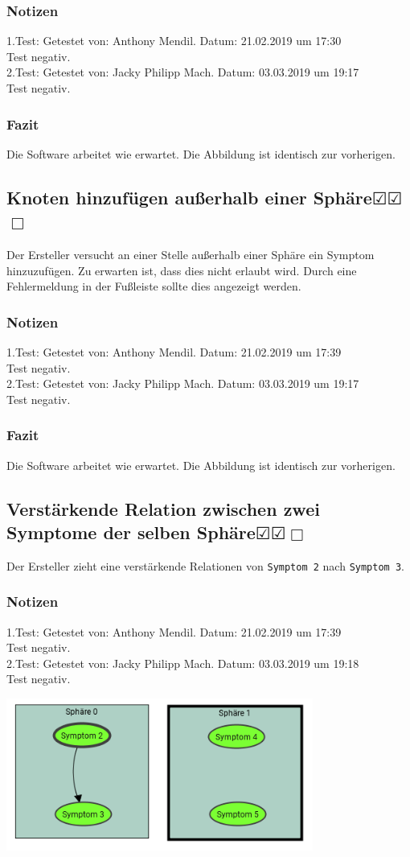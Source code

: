 \documentclass[enabledeprecatedfontcommands]{scrartcl}
\newcommand{\subsectiont}[2]{\subsection[#1]{#1{\normalsize\normalfont #2}}}
\newcommand{\leer}{$\Box$}
\newcommand{\ok}{$\CheckedBox$}
\begin{document}
\subsubsection{Notizen}
1.Test: Getestet von: Anthony Mendil. Datum: 21.02.2019 um 17:30 \\
Test negativ.\\
2.Test: Getestet von: Jacky Philipp Mach. Datum: 03.03.2019 um 19:17 \\
Test negativ.
\subsubsection{Fazit}
Die Software arbeitet wie erwartet. Die Abbildung ist identisch zur vorherigen.

\subsectiont{Knoten hinzufügen außerhalb einer Sphäre}{\dotfill\ok\ok\leer}
Der Ersteller versucht an einer Stelle außerhalb einer Sphäre ein Symptom hinzuzufügen. Zu erwarten ist, dass dies nicht erlaubt wird. Durch eine Fehlermeldung in der Fußleiste sollte dies angezeigt werden. 
\subsubsection{Notizen}
1.Test: Getestet von: Anthony Mendil. Datum: 21.02.2019 um 17:39 \\
Test negativ.\\
2.Test: Getestet von: Jacky Philipp Mach. Datum: 03.03.2019 um 19:17 \\
Test negativ.
\subsubsection{Fazit}
Die Software arbeitet wie erwartet. Die Abbildung ist identisch zur vorherigen.

\subsectiont{Verstärkende Relation zwischen zwei Symptome der selben Sphäre}{\dotfill\ok\ok\leer}
Der Ersteller zieht eine verstärkende Relationen von \texttt{Symptom 2} nach \texttt{Symptom 3}. 
\subsubsection{Notizen}
1.Test: Getestet von: Anthony Mendil. Datum: 21.02.2019 um 17:39 \\
Test negativ.\\
2.Test: Getestet von: Jacky Philipp Mach. Datum: 03.03.2019 um 19:18 \\
Test negativ.
\begin{center}
\includegraphics[height=5cm]{1_6.PNG}
\end{center}
\end{document}
